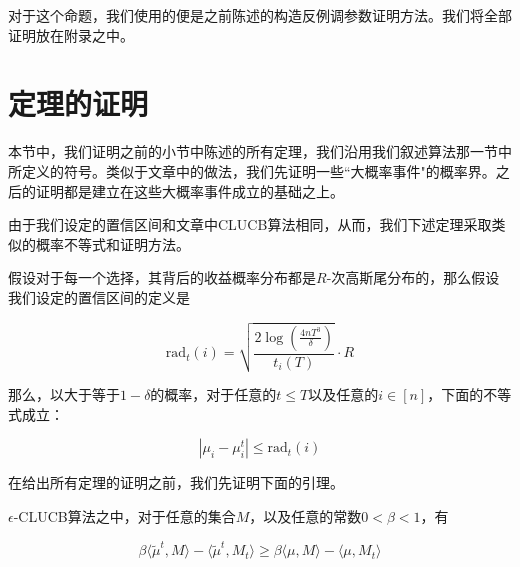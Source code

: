 \documentclass[bachelor]{thuthesis}
\begin{document}
对于这个命题，我们使用的便是之前陈述的构造反例调参数证明方法。我们将全部证明放在附录之中。




\chapter{定理的证明}
\label{cha:china}

本节中，我们证明之前的小节中陈述的所有定理，我们沿用我们叙述算法那一节中所定义的符号。类似于文章\cite{cpemab}中的做法，我们先证明一些``大概率事件"的概率界。之后的证明都是建立在这些大概率事件成立的基础之上。

由于我们设定的置信区间和文章\cite{cpemab}中CLUCB算法相同，从而，我们下述定理采取类似的概率不等式和证明方法。

\begin{lemma}

\label{lem:pro}

假设对于每一个选择，其背后的收益概率分布都是$R$-次高斯尾分布的，那么假设我们设定的置信区间的定义是

\[\text{rad}_t(i)=\sqrt{\frac{2\log \left(\frac{4nT^3}{\delta}\right)}{t_i(T)}}\cdot R\]

那么，以大于等于$1-\delta$的概率，对于任意的$t\le T$以及任意的$i\in [n]$，下面的不等式成立：

\[|\mu_i-\mu^t_i|\le \text{rad}_t(i)\]

\end{lemma}



在给出所有定理的证明之前，我们先证明下面的引理。

\begin{lemma}

\label{lem:key}

$\epsilon$-CLUCB算法之中，对于任意的集合$M$，以及任意的常数$0<\beta<1$，有

\[\beta\langle\tilde{\mu}^t,M\rangle - \langle\tilde{\mu}^t,M_t\rangle
\ge
\beta\langle\mu,M\rangle - \langle\mu,M_t\rangle\]

\end{lemma}
\end{document}
